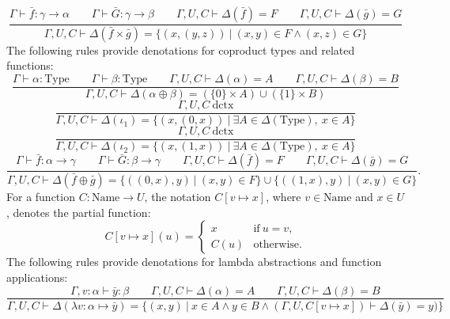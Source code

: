 \documentclass[11pt]{article}
\begin{document}
\begin{equation}
	\frac{\Gamma \vdash \bar{f} : \gamma \to \alpha
	\qquad \Gamma \vdash \bar{G} : \gamma \to \beta
	\qquad \Gamma,U,C \vdash \Delta(\bar{f}) = F
	\qquad \Gamma,U,C \vdash \Delta(\bar{g}) = G}
	{\Gamma,U,C \vdash \Delta(\bar{f} \times \bar{g}) =
	\{(x,(y,z))\ |\ (x,y) \in F \wedge (x,z) \in G\}}
\end{equation}
The following rules provide denotations for coproduct types
and related functions:
\begin{equation}
	\frac{\Gamma \vdash \alpha : \text{Type}
	\qquad \Gamma \vdash \beta : \text{Type}
	\qquad \Gamma,U,C \vdash \Delta(\alpha) = A
	\qquad \Gamma,U,C \vdash \Delta(\beta) = B}
	{\Gamma,U,C \vdash \Delta(\alpha \oplus \beta) =
	(\{0\} \times A) \cup (\{1\} \times B)}
\end{equation}
\begin{equation}
	\frac{\Gamma,U,C\ \text{dctx}}
	{\Gamma,U,C \vdash \Delta(\iota_1) =
	\{(x,(0,x))\ |\ \exists A \in \Delta(\text{Type}),\ x \in A\}}
\end{equation}
\begin{equation}
	\frac{\Gamma,U,C\ \text{dctx}}
	{\Gamma,U,C \vdash \Delta(\iota_2) =
	\{(x,(1,x))\ |\ \exists A \in \Delta(\text{Type}),\ x \in A\}}
\end{equation}
\begin{equation}
	\frac{\Gamma \vdash \bar{f} : \alpha \to \gamma
	\qquad \Gamma \vdash \bar{G} : \beta \to \gamma
	\qquad \Gamma,U,C \vdash \Delta(\bar{f}) = F
	\qquad \Gamma,U,C \vdash \Delta(\bar{g}) = G}
	{\Gamma,U,C \vdash \Delta(\bar{f} \oplus \bar{g}) =
	\{((0,x),y)\ |\ (x,y) \in F\}
	\cup \{((1,x),y)\ |\ (x,y) \in G\}}.
\end{equation}
For a function $C : \text{Name} \to U$, the notation
$C[v \mapsto x]$, where $v \in \text{Name}$ and $x \in U$,
denotes the partial function:
\begin{equation}
	C[v \mapsto x](u) = \begin{cases}
		x & \text{if}\ u = v, \\
		C(u) & \text{otherwise}.
	\end{cases}
\end{equation}
The following rules provide denotations for lambda abstractions
and function applications:
\begin{equation}
	\frac{\Gamma, v : \alpha \vdash \bar{y} : \beta
	\qquad \Gamma,U,C \vdash \Delta(\alpha) = A
	\qquad \Gamma,U,C \vdash \Delta(\beta) = B}
	{\Gamma,U,C \vdash \Delta(\lambda v : \alpha \mapsto \bar{y})
	= \{(x, y)\ |\ x \in A \wedge y \in B
	\wedge (\Gamma,U,C[v \mapsto x])
	\vdash \Delta(\bar{y}) = y)\}}
\end{equation}
\end{document}
